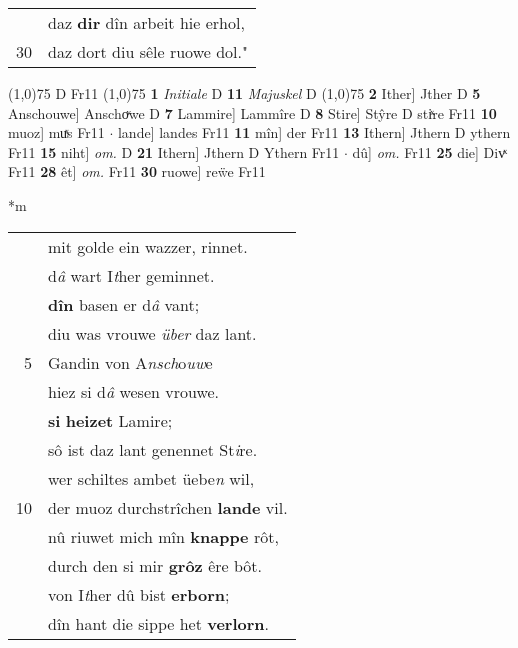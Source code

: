 \documentclass[8pt,a4paper,notitlepage]{article}
\begin{document}
\begin{table}[ht]
\begin{minipage}[t]{0.5\linewidth}
\begin{tabular}{rl}
 & daz \textbf{dir} dîn arbeit hie erhol,\\ 
30 & daz dort diu sêle ruowe dol."\\ 
\end{tabular}
\scriptsize
\line(1,0){75} \newline
D Fr11 \newline
\line(1,0){75} \newline
\textbf{1} \textit{Initiale} D  \textbf{11} \textit{Majuskel} D  \newline
\line(1,0){75} \newline
\textbf{2} Ither] Jther D \textbf{5} Anschouwe] Anschoͮwe D \textbf{7} Lammire] Lammîre D \textbf{8} Stire] Stŷre D stiͯre Fr11 \textbf{10} muoz] muͯs Fr11  $\cdot$ lande] landes Fr11 \textbf{11} mîn] der Fr11 \textbf{13} Ithern] Jthern D ythern Fr11 \textbf{15} niht] \textit{om.} D \textbf{21} Ithern] Jthern D Ythern Fr11  $\cdot$ dû] \textit{om.} Fr11 \textbf{25} die] Divͯ Fr11 \textbf{28} êt] \textit{om.} Fr11 \textbf{30} ruowe] reẅe Fr11 \newline
\end{minipage}
\hspace{0.5cm}
\begin{minipage}[t]{0.5\linewidth}
\small
\begin{center}*m
\end{center}
\begin{tabular}{rl}
 & mit golde ein wazzer, rinnet.\\ 
 & d\textit{â} wart I\textit{t}her geminnet.\\ 
 & \textbf{dîn} basen er d\textit{â} vant;\\ 
 & diu was vrouwe \textit{über} daz lant.\\ 
5 & Gandin von A\textit{nsch}o\textit{uw}e \\ 
 & hiez si d\textit{â} wesen vrouwe.\\ 
 & \textbf{si} \textbf{heizet} Lamire;\\ 
 & sô ist daz lant genennet St\textit{i}re.\\ 
 & wer schiltes ambet üebe\textit{n} wil,\\ 
10 & der muoz durchstrîchen \textbf{lande} vil.\\ 
 & nû riuwet mich mîn \textbf{knappe} rôt,\\ 
 & durch den si mir \textbf{grôz} êre bôt.\\ 
 & von I\textit{t}her dû bist \textbf{erborn};\\ 
 & dîn hant die sippe het \textbf{verlorn}.\\ 

\end{tabular}
\end{minipage}
\end{table}
\end{document}
